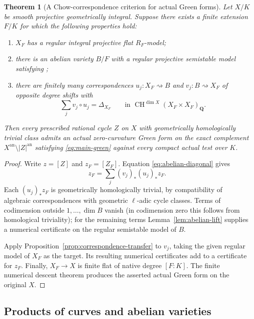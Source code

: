 \documentclass[11pt]{article}
\newtheorem{theorem}{Theorem}[section]
\theoremstyle{definition}
\theoremstyle{remark}
\numberwithin{equation}{section}
\newcommand{\CH}{\operatorname{CH}}
\newcommand{\an}{\mathrm{an}}
\begin{document}
\begin{theorem}[A Chow-correspondence criterion for actual Green forms]
\label{thm:chow-abelian-criterion}
Let $X/K$ be smooth projective geometrically integral.  Suppose
there exists a finite extension $F/K$ for which the following
properties hold:
\begin{enumerate}
\item $X_F$ has a regular integral projective flat $R_F$-model;
\item there is an abelian variety $B/F$ with a regular projective
  semistable model satisfying ;
\item there are finitely many correspondences
  $u_j:X_F\rightsquigarrow B$ and
  $v_j:B\rightsquigarrow X_F$ of opposite degree shifts
  with
  \begin{equation}\label{eq:abelian-diagonal}
                \sum_jv_j\circ u_j=\Delta_{X_F}
       \qquad\text{in }\CH^{\dim X}(X_F\times X_F)_{\mathbf Q}.
  \end{equation}
\end{enumerate}
Then every prescribed rational cycle $Z$ on $X$ with
geometrically homologically trivial class admits an actual
zero-curvature Green form on the exact complement
$X^{\an}\setminus |Z|^{\an}$ satisfying
\eqref{eq:main-green} against every compact actual test over $K$.
\end{theorem}

\begin{proof}
Write $z=[Z]$ and $z_F=[Z_F]$.  Equation
\eqref{eq:abelian-diagonal} gives
\[
             z_F=\sum_j(v_j)_*(u_j)_*z_F.
\]
Each $(u_j)_*z_F$ is geometrically homologically trivial, by
compatibility of algebraic correspondences with geometric
$\ell$-adic cycle classes.  Terms of codimension outside
$1,\ldots,\dim B$ vanish (in codimension zero this follows
from homological triviality); for the remaining terms
Lemma~\ref{lem:abelian-lift} supplies a numerical certificate on
the regular semistable model of $B$.

Apply Proposition~\ref{prop:correspondence-transfer} to $v_j$, taking the
given regular model of $X_F$ as the target.  Its resulting
numerical certificates add to a certificate for $z_F$.
Finally, $X_F\to X$ is finite flat of native degree $[F:K]$.
The finite numerical descent theorem 
produces the asserted actual Green form on the original $X$.
\end{proof}

\subsection{Products of curves and abelian varieties}
\end{document}

